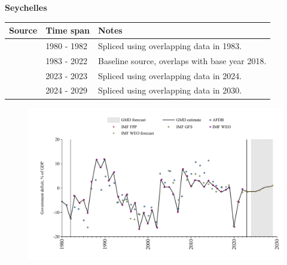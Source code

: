 \documentclass[12pt,a4paper,landscape]{article}
\begin{document}
\begin{adjustbox}{max totalsize={\paperwidth}{\paperheight},center}
\begin{minipage}[t][\textheight][t]{\textwidth}
\vspace*{0.5cm}
{}
\begin{center}
{\Large\bfseries Seychelles}
\end{center}
\vspace{0.5cm}
\begin{table}[H]
\centering
\small
\begin{tabular}{|l|l|l|}
\hline
\textbf{Source} & \textbf{Time span} & \textbf{Notes} \\
\hline
\rowcolor{white}\cite{AFDB}& 1980 - 1982 &Spliced using overlapping data in 1983.\\
\rowcolor{lightgray}\cite{IMF_WEO}& 1983 - 2022 &Baseline source, overlaps with base year 2018.\\
\rowcolor{white}\cite{IMF_GFS}& 2023 - 2023 &Spliced using overlapping data in 2024.\\
\rowcolor{lightgray}\cite{IMF_WEO_forecast}& 2024 - 2029 &Spliced using overlapping data in 2030.\\
\hline
\end{tabular}
\end{table}
\begin{figure}[H]
\centering
\includegraphics[width=\textwidth,height=0.6\textheight,keepaspectratio]{graphs/SYC_govdef_GDP.pdf}
\end{figure}
\end{minipage}
\end{adjustbox}
\end{document}
